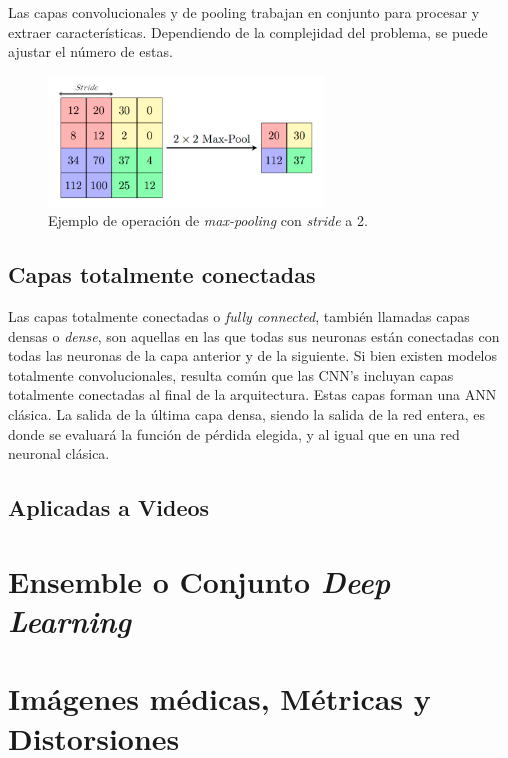 Las capas convolucionales y de pooling trabajan en conjunto para procesar y extraer 
características. 
Dependiendo de la complejidad del problema, se puede ajustar el número de estas.

\begin{figure}[htp]
  \begin{center}
    \includegraphics[width=0.65\textwidth]{imagenes/chapter2/MaxpoolSample.png}
  \end{center}

  \caption{
    Ejemplo de operación de \emph{max-pooling} con \emph{stride} a 2.
  }
  \label{fig:PoolingExample}
\end{figure}

\subsection{Capas totalmente conectadas}
Las capas totalmente conectadas o \emph{fully connected}, también llamadas 
capas densas o \emph{dense}, son aquellas en las que todas sus neuronas 
están conectadas con todas las neuronas de la capa anterior y de la
siguiente. Si bien existen modelos totalmente convolucionales, resulta común
que las CNN's incluyan capas totalmente conectadas al final de la arquitectura.
Estas capas forman una ANN clásica.
La salida de la última capa densa, siendo la salida de la red entera, es donde
se evaluará la función de pérdida elegida, y al igual que en una red neuronal
clásica.


\subsection{Aplicadas a Videos} 

\section{Ensemble o Conjunto \emph{Deep Learning}}

\section{Imágenes médicas, Métricas y Distorsiones}
\label{sec:Distorsiones}

